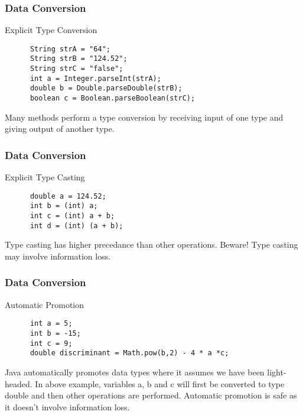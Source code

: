 \documentclass[10pt, compress]{beamer}
\begin{document}
\begin{frame}[fragile]
  \frametitle{Data Conversion}
  \begin{block}{Explicit Type Conversion}
    \begin{verbatim}
      String strA = "64";
      String strB = "124.52";
      String strC = "false";
      int a = Integer.parseInt(strA);
      double b = Double.parseDouble(strB);
      boolean c = Boolean.parseBoolean(strC);
    \end{verbatim}
    Many methods perform a type conversion by receiving input of one type and giving output of another type.
  \end{block}
\end{frame}

\begin{frame}[fragile]
  \frametitle{Data Conversion}
  \begin{block}{Explicit Type Casting}
    \begin{verbatim}
      double a = 124.52;
      int b = (int) a;
      int c = (int) a + b;
      int d = (int) (a + b);
    \end{verbatim}
    Type casting has higher precedance than other operations. Beware! Type casting may involve information loss.
  \end{block}
\end{frame}

\begin{frame}[fragile]
  \frametitle{Data Conversion}
  \begin{block}{Automatic Promotion}
    \begin{verbatim}
      int a = 5;
      int b = -15;
      int c = 9;
      double discriminant = Math.pow(b,2) - 4 * a *c;
    \end{verbatim}
    Java automatically promotes data types where it assumes we have been light-headed. In above example, variables a, b and c will first be converted to type double and then other operations are performed. Automatic promotion is safe as it doesn't involve information loss.
  \end{block}
\end{frame}

\end{document}
